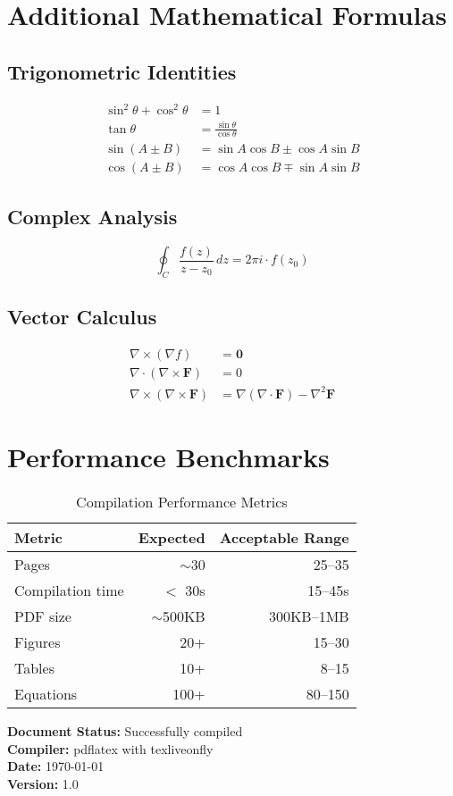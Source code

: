 \documentclass[11pt,a4paper]{article}
\theoremstyle{definition}
\begin{document}
\appendix

\section{Additional Mathematical Formulas}

\subsection{Trigonometric Identities}

\begin{align}
    \sin^2\theta + \cos^2\theta &= 1 \\
    \tan\theta &= \frac{\sin\theta}{\cos\theta} \\
    \sin(A \pm B) &= \sin A \cos B \pm \cos A \sin B \\
    \cos(A \pm B) &= \cos A \cos B \mp \sin A \sin B
\end{align}

\subsection{Complex Analysis}

\begin{equation}
    \oint_C \frac{f(z)}{z-z_0}\,dz = 2\pi i \cdot f(z_0)
\end{equation}

\subsection{Vector Calculus}

\begin{align}
    \nabla \times (\nabla f) &= \mathbf{0} \\
    \nabla \cdot (\nabla \times \mathbf{F}) &= 0 \\
    \nabla \times (\nabla \times \mathbf{F}) &= \nabla(\nabla \cdot \mathbf{F}) - \nabla^2\mathbf{F}
\end{align}

\section{Performance Benchmarks}

\begin{table}[H]
\centering
\caption{Compilation Performance Metrics}
\label{tab:performance}
\begin{tabular}{lrr}
\toprule
\textbf{Metric} & \textbf{Expected} & \textbf{Acceptable Range} \\
\midrule
Pages & $\sim$30 & 25--35 \\
Compilation time & $<$ 30s & 15--45s \\
PDF size & $\sim$500KB & 300KB--1MB \\
Figures & 20+ & 15--30 \\
Tables & 10+ & 8--15 \\
Equations & 100+ & 80--150 \\
\bottomrule
\end{tabular}
\end{table}

\vspace{2cm}

\noindent\textbf{Document Status:} Successfully compiled \\
\textbf{Compiler:} pdflatex with texliveonfly \\
\textbf{Date:} \today \\
\textbf{Version:} 1.0
\end{document}
